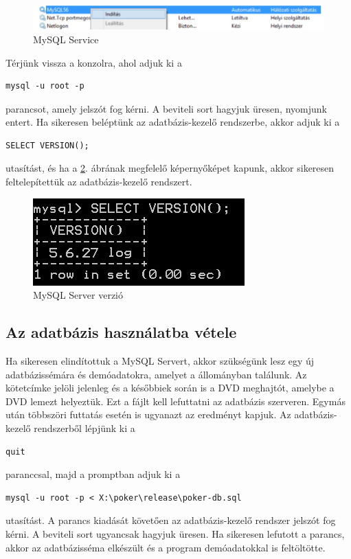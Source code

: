 \clearpage

\begin{figure}[h!]
  \caption{MySQL Service}
  \label{fig:mysql_service}
  \centering
    \includegraphics{user-documentation/images/mysql_service.jpg}
\end{figure}
Térjünk vissza a konzolra, ahol adjuk ki a 
 \begin{verbatim}
mysql -u root -p
\end{verbatim}
parancsot, amely jelszót fog kérni. A beviteli sort hagyjuk üresen, nyomjunk entert. Ha sikeresen beléptünk az adatbázis-kezelő rendszerbe, akkor adjuk ki a
 \begin{verbatim}
SELECT VERSION();
\end{verbatim}
utasítást, és ha a \ref{fig:mysql_version}. ábrának megfelelő képernyőképet kapunk, akkor sikeresen feltelepítettük az adatbázis-kezelő rendszert.
\begin{figure}[h!]
  \caption{MySQL Server verzió}
  \label{fig:mysql_version}
  \centering
    \includegraphics{user-documentation/images/mysql_version.jpg}
\end{figure}

\subsection{Az adatbázis használatba vétele}
Ha sikeresen elindítottuk a MySQL Servert, akkor szükségünk lesz egy új adatbázissémára és demóadatokra, amelyet a  állományban találunk. Az  kötetcímke jelöli jelenleg és a későbbiek során is a DVD meghajtót, amelybe a DVD lemezt helyeztük. Ezt a fájlt kell lefuttatni az adatbázis szerveren. Egymás után többszöri futtatás esetén is ugyanazt az eredményt kapjuk. Az adatbázis-kezelő rendszerből lépjünk ki a 
\begin{verbatim}
quit
\end{verbatim}
paranccsal, majd a promptban adjuk ki a
 \begin{verbatim}
mysql -u root -p < X:\poker\release\poker-db.sql
\end{verbatim}
utasítást. A parancs kiadását követően az adatbázis-kezelő rendszer jelszót fog kérni. A beviteli sort ugyancsak hagyjuk üresen. Ha sikeresen lefutott a parancs, akkor az adatbázisséma elkészült és a program demóadatokkal is feltöltötte.

